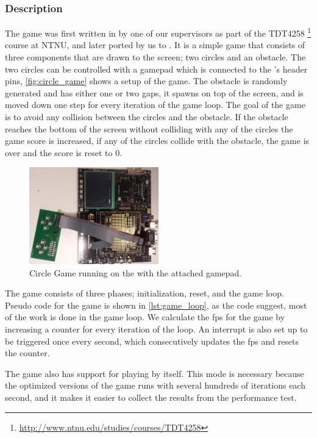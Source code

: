\subsubsection{Description}

The game was first written in {\C} by one of our supervisors as part of the TDT4258 \footnote{\url{http://www.ntnu.edu/studies/courses/TDT4258}} course at NTNU, and later ported by us to {\rust}.
It is a simple game that consists of three components that are drawn to the screen; two circles and an obstacle.
The two circles can be controlled with a gamepad which is connected to the {\DK}'s header pins, \autoref{fig:circle_game} shows a setup of the game.
The obstacle is randomly generated and has either one or two gaps, it spawns on top of the screen, and is moved down one step for every iteration of the game loop.
The goal of the game is to avoid any collision between the circles and the obstacle.
If the obstacle reaches the bottom of the screen without colliding with any of the circles the game score is increased, if any of the circles collide with the obstacle, the game is over and the score is reset to 0.

\begin{figure}[H]
  \centering
  \includegraphics[width=0.5\textwidth]{figures/circle-game.jpg}
  \caption{Circle Game running on the {\DK} with the attached gamepad.}
  \label{fig:circle_game}
\end{figure}

The game consists of three phases; initialization, reset, and the game loop.
Pseudo code for the game is shown in \autoref{lst:game_loop}, as the code suggest, most of the work is done in the game loop.
We calculate the \gls{fps} for the game by increasing a counter for every iteration of the loop.
An interrupt is also set up to be triggered once every second, which consecutively updates the \gls{fps} and resets the counter.

The game also has support for playing by itself.
This mode is necessary because the optimized versions of the game runs with several hundreds of iterations each second, and it makes it easier to collect the results from the performance test.


